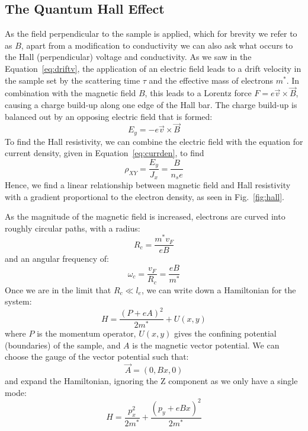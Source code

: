 \subsection{The Quantum Hall Effect}
As the field perpendicular to the sample is applied, which for brevity we refer to as $B$, apart from a modification to conductivity
we can also ask what occurs to the Hall (perpendicular) voltage and conductivity. As we saw in the Equation~\ref{eq:driftv},
the application of an electric field leads to a drift velocity in the sample set by the scattering
time $\tau$ and the effective mass of electrons $m^*$. In combination with the magnetic field $B$, this leads to a Lorentz force $F = e \vec v \times \vec B$, causing
a charge build-up along one edge of the Hall bar. The charge build-up is balanced out by an opposing electric field that is formed:
\begin{equation}
  E_y = -e \vec v \times \vec B
\end{equation}
To find the Hall resistivity, we can combine the electric field with the equation for current density, given in Equation~\ref{eq:currden}, to find
\begin{equation}
  \rho_{XY} = \frac{E_y}{J_x} = \frac{B}{n_s e}
\end{equation}
Hence, we find a linear relationship between magnetic field and Hall resistivity with a gradient proportional to the electron density, as seen in Fig.~\ref{fig:hall}.

As the magnitude of the magnetic field is increased, electrons are curved into roughly circular paths, with a radius:
\begin{equation}
  R_c = \frac{m^* v_F}{e B}
\end{equation}
and an angular frequency of:
\begin{equation}
  \omega_c = \frac{v_F}{R_c} = \frac{e B}{m^*}
  \label{eq:cycl}
\end{equation}
Once we are in the limit that $R_c \ll l_e$, we can write down a Hamiltonian for the system:
\begin{equation}
  H = \frac{(P + eA)^2}{2m^*} + U(x, y)
\end{equation}
where $P$ is the momentum operator, $U(x, y)$ gives the confining potential (boundaries) of the sample,
and $A$ is the magnetic vector potential. We can choose the gauge of the vector potential such
that:
\begin{equation}
  \vec{A} = (0, Bx, 0)
\end{equation}
and expand the Hamiltonian, ignoring the Z component as we only have a single mode:
\begin{equation}
  H = \frac{p_x^2}{2m^*} + \frac{(p_y + eBx)^2}{2m^*}
\end{equation}


